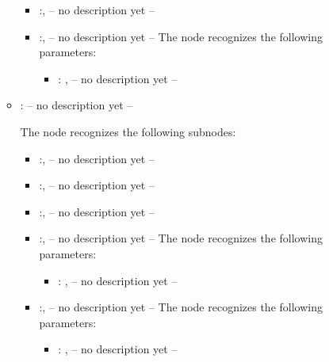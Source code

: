 \begin{itemize}
\begin{itemize}
\begin{itemize}
            \item {}:, 
              -- no description yet --

            \item {}:, 
              -- no description yet --
              The  node recognizes the following parameters:
                \begin{itemize}
                  \item {}: , 
                    -- no description yet --
              \end{itemize}
          \end{itemize}

        \item {}:
          -- no description yet --

          The  node recognizes the following subnodes:
          \begin{itemize}
            \item {}:, 
              -- no description yet --

            \item {}:, 
              -- no description yet --

            \item {}:, 
              -- no description yet --

            \item {}:, 
              -- no description yet --
              The  node recognizes the following parameters:
                \begin{itemize}
                  \item {}: , 
                    -- no description yet --
              \end{itemize}

            \item {}:, 
              -- no description yet --
              The  node recognizes the following parameters:
                \begin{itemize}
                  \item {}: , 
                    -- no description yet --
              \end{itemize}


\end{itemize}
\end{itemize}
\end{itemize}
